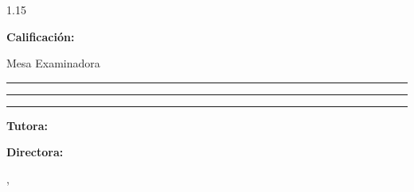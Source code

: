 \thispagestyle{plain}
\begin{spacing}{1.15}
\begin{center}
  \vspace*{0.2cm}
  {\Large \Universidad\par}
  \vspace{0.35cm}
  {\large \Campus\par}
  \vspace{0.55cm}
  {\normalsize \Unidad\par}
  \vspace{0.25cm}
  {\normalsize \Carrera\par}
  \vspace{0.25cm}
  {\normalsize \Autor\par}

  \vspace{0.8cm}
  {\bfseries\large \Titulo\par}
\end{center}

\vspace{0.9cm}
\noindent
\begin{minipage}[t]{0.47\textwidth}
  \raggedright
  {\large \textbf{Calificación:}}
\end{minipage}%
\hfill
\begin{minipage}[t]{0.46\textwidth}
  \raggedleft
  {\normalsize Mesa Examinadora\par}
  \vspace{1.0cm}
  \rule{\linewidth}{0.5pt}\par
  \vspace{0.9cm}
  \rule{\linewidth}{0.5pt}\par
  \vspace{0.9cm}
  \rule{\linewidth}{0.5pt}\par
\end{minipage}

\vfill
\begin{center}
  {\normalsize \textbf{Tutora:} \Tutora\par}
  \vspace{0.4cm}
  {\large \textbf{Directora: \Directora}\par}
  \vspace{0.7cm}
  {\normalsize \Ciudad, \Fecha\par}
\end{center}
\end{spacing}
\clearpage
